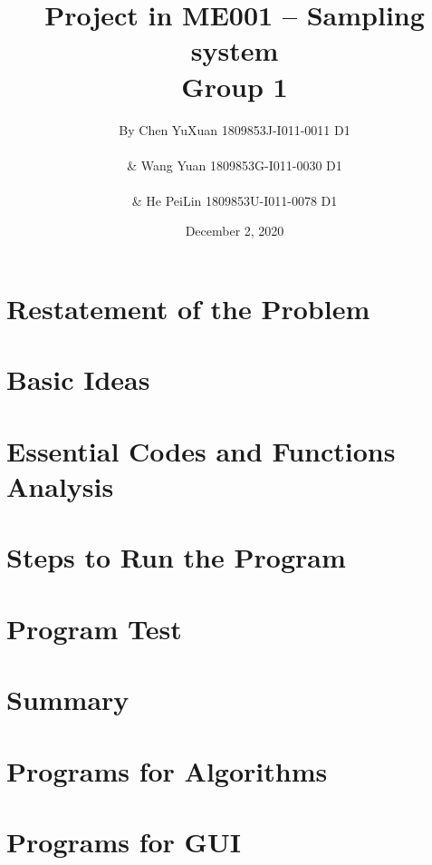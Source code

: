 \documentclass[12pt]{article}
\begin{document}
\title{\textbf{Project in ME001 -- Sampling system\\Group 1}}

\author{By Chen YuXuan 1809853J-I011-0011 D1\\ \\
\& Wang Yuan 1809853G-I011-0030 D1\\ \\
\& He PeiLin 1809853U-I011-0078 D1}

\date{December 2, 2020}
\maketitle

\newpage
\tableofcontents
\newpage

\section{Restatement of the Problem}


\section{Basic Ideas}


\section{Essential Codes and Functions Analysis}


\section{Steps to Run the Program}


\section{Program Test}


\section{Summary}




\newpage
\appendix
\appendixpage
\addappheadtotoc
    \section{Programs for Algorithms}
        \lstset{title=\lstname}
        
    \section{Programs for GUI}
        \lstset{title=\lstname}
        
\end{document}

